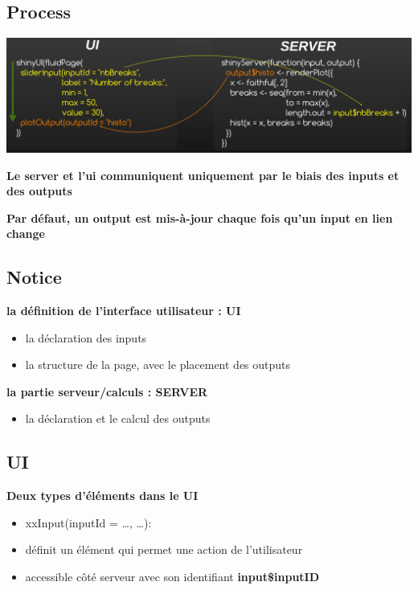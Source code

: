 \documentclass[
]{article}
\providecommand{\tightlist}{%
  \setlength{\itemsep}{0pt}\setlength{\parskip}{0pt}}
\begin{document}
\hypertarget{process}{%
\subsection{Process}\label{process}}

\includegraphics{img/shiny_process.png}

\textbf{Le server et l'ui communiquent uniquement par le biais des
inputs et des outputs}

\textbf{Par défaut, un output est mis-à-jour chaque fois qu'un input en
lien change}

\hypertarget{notice}{%
\subsection{Notice}\label{notice}}

\textbf{la définition de l'interface utilisateur : UI}

\begin{itemize}
\tightlist
\item
  la déclaration des inputs
\item
  la structure de la page, avec le placement des outputs
\end{itemize}

\textbf{la partie serveur/calculs : SERVER}

\begin{itemize}
\tightlist
\item
  la déclaration et le calcul des outputs
\end{itemize}

\hypertarget{ui}{%
\subsection{UI}\label{ui}}

\textbf{Deux types d'éléments dans le UI}

\begin{itemize}
\item
  xxInput(inputId = \ldots, \ldots):
\item
  définit un élément qui permet une action de l'utilisateur
\item
  accessible côté serveur avec son identifiant \textbf{input\$inputID}
\end{itemize}
\end{document}
